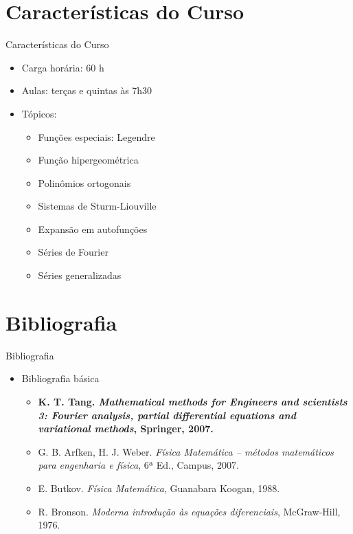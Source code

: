    \section[ slide = true ]{Características do Curso}
      \begin{slide}[toc=]{Características do Curso}
         \begin{itemize}
            \item Carga horária: 60 h
            \item Aulas: terças e quintas às 7h30
            \item Tópicos:
            \begin{itemize}
               \item Funções especiais: Legendre
               \item Função hipergeométrica
               \item Polinômios ortogonais
	       \item Sistemas de Sturm-Liouville
               \item Expansão em autofunções
               \item Séries de Fourier
	       \item Séries generalizadas
            \end{itemize}
         \end{itemize}         
      \end{slide}
      
   \section[ slide = true ]{Bibliografia}
      \begin{slide}[toc=]{Bibliografia}
         \begin{itemize}
            \item Bibliografia básica
            \begin{itemize}
		    \item \textbf{K. T. Tang. \emph{Mathematical methods for Engineers and scientists 3: Fourier analysis, partial differential equations and variational methods}, Springer, 2007.}
               \item {G. B. Arfken, H. J. Weber. \emph{Física Matemática -- métodos matemáticos para engenharia e física}, 6ª Ed., Campus, 2007.}
               \item {E. Butkov. \emph{Física Matemática}, Guanabara Koogan, 1988.}
               \item {R. Bronson. \emph{Moderna introdução às equações diferenciais}, McGraw-Hill, 1976.}
            \end{itemize}
         \end{itemize}
      \end{slide}

